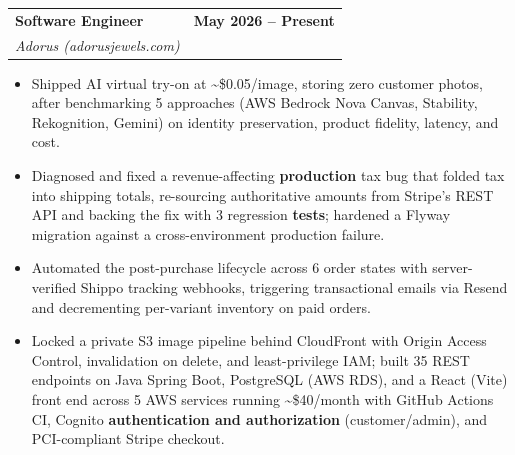 \documentclass[letterpaper,10pt]{article}
\makeatletter
\newcommand{\nk}{\kern0pt}
\newcommand{\resumeItem}[1]{
  \item\small{
    {#1 \vspace{-3pt}}
  }
}
\newcommand{\resumeSubheading}[4]{
  \vspace{-2pt}\item
    \begin{tabular*}{0.97\textwidth}[t]{l@{\extracolsep{\fill}}r}
      \textbf{#1} & \textbf{#2} \\   %
      \textit{\small#3} & \textit{\small #4} \\
    \end{tabular*}\vspace{-7pt}
}
\newcommand{\resumeItemListStart}{\begin{itemize}}
\newcommand{\resumeItemListEnd}{\end{itemize}\vspace{-7pt}}
\makeatother
\begin{document}
    \resumeSubheading
      {Software Engineer}{May 2026 -- Present}
      {Adorus (adorusjewels.com)}{}
      \resumeItemListStart
        \resumeItem{Shipped AI virtual try-on at \textasciitilde\$0.05/image, storing zero customer photos, after benchmarking 5 approaches (A\nk WS Bedrock Nova Canvas, Stability, Rekognition, Gemini) on identity preservation, product fidelity, latency, and cost.}
        \resumeItem{Diagnosed and fixed a revenue-affecting \textbf{production} tax bug that folded tax into shipping totals, re-sourcing authoritative amounts from Stripe's REST API and backing the fix with 3 regression \textbf{tests}; hardened a Flyway migration against a cross-environment production failure.}
        \resumeItem{Automated the post-purchase lifecycle across 6 order states with server-verified Shippo tracking webhooks, triggering transactional emails via Resend and decrementing per-variant inventory on paid orders.}
        \resumeItem{Locked a private S3 image pipeline behind CloudFront with Origin Access Control, invalidation on delete, and least-privilege IAM; built 35 REST endpoints on Java Spring Boot, PostgreSQL (A\nk WS RDS), and a React (Vite) front end across 5 A\nk WS services running \textasciitilde\$40/month with GitHub Actions CI, Cognito \textbf{authentication and authorization} (customer/admin), and PCI-compliant Stripe checkout.}
      \resumeItemListEnd
\end{document}
